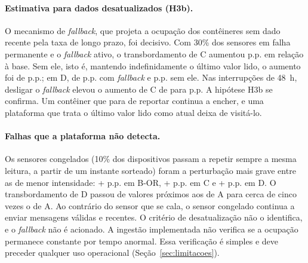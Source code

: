 \paragraph{Estimativa para dados desatualizados (H3b).}
O mecanismo de \emph{fallback}, que projeta a ocupação dos contêineres sem
dado recente pela taxa de longo prazo, foi decisivo. Com 30\% dos sensores em
falha permanente e o \emph{fallback} ativo, o transbordamento de C aumentou
\DifETdegradacaoFalhaPermTZCvsCOv{} p.p. em relação à base. Sem ele, isto é,
mantendo indefinidamente o último valor lido, o aumento foi de
\DifETdegradacaoFalhaPermTZSemFallbackCvsCOv{} p.p.; em D, de
\DifETdegradacaoFalhaPermTZDvsDOv{} p.p. com \emph{fallback} e
\DifETdegradacaoFalhaPermTZSemFallbackDvsDOv{} p.p. sem ele. Nas interrupções
de 48~h, desligar o \emph{fallback} elevou o aumento de C de
\DifETdegradacaoInterrupcaoQOHCvsCOv{} para
\DifETdegradacaoInterrupcaoQOHSemFallbackCvsCOv{} p.p. A hipótese H3b se
confirma. Um contêiner que para de reportar continua a encher, e uma
plataforma que trata o último valor lido como atual deixa de visitá-lo.

\paragraph{Falhas que a plataforma não detecta.}
Os sensores congelados (10\% dos dispositivos passam a repetir sempre a mesma
leitura, a partir de um instante sorteado) foram a perturbação mais grave
entre as de menor intensidade: +\DifETdegradacaoCongeladoUZBORvsBOROv{} p.p.
em B-OR, +\DifETdegradacaoCongeladoUZCvsCOv{} p.p. em C e
+\DifETdegradacaoCongeladoUZDvsDOv{} p.p. em D. O transbordamento de D
passou de valores próximos aos de A para cerca de cinco vezes o de A. Ao
contrário do sensor que se cala, o sensor congelado continua a enviar
mensagens válidas e recentes. O critério de desatualização não o identifica,
e o \emph{fallback} não é acionado. A ingestão implementada não verifica se
a ocupação permanece constante por tempo anormal. Essa verificação é simples
e deve preceder qualquer uso operacional (Seção~\ref{sec:limitacoes}).

